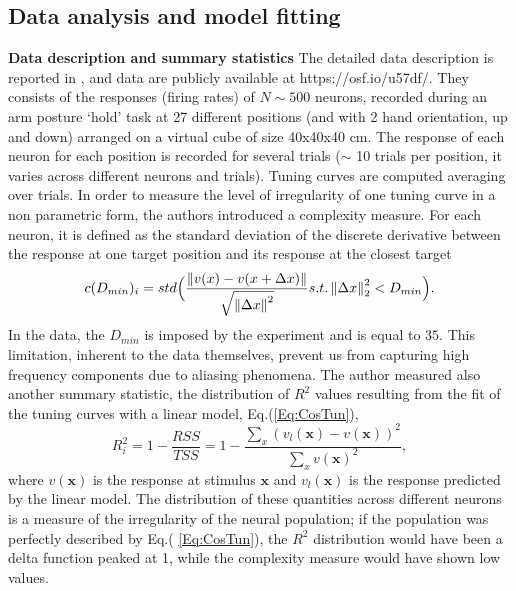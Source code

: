 \documentclass[a4paper]{article}%
\begin{document}
\subsection{Data analysis and model fitting}
\textbf{Data description and summary statistics}
The detailed data description is reported in
\cite{Lalazar2016TuningConnectivity}, and data are publicly available at https://osf.io/u57df/. They consists of  the
responses (firing rates) of $N \sim 500$ neurons,  recorded during an arm posture `hold' task at 27
different positions (and with 2 hand orientation, up and down) arranged on a
virtual cube of size 40x40x40 cm. The response of each neuron for each
position is recorded for several trials ($\sim$ 10 trials per position, it varies across different neurons and trials).  Tuning curves are computed averaging over trials. In order to measure the
level of irregularity of one tuning curve in a non parametric form, the
authors introduced a
complexity measure. For each neuron, it is defined as the standard deviation
of the discrete derivative between the response at one target position and its response
at the closest target
\begin{equation}
c(D_{min})_{i} = std\Bigl(\frac{\left\|  v(x) - v(x+\Delta x)\right\|  }
{\sqrt{\left\|  \Delta x\right\|  ^{2}}} s.t. \left\|  \Delta x\right\|
_{2}^{2} < D_{min}\Bigr).
\end{equation}
In the data, the $D_{min}$ is imposed by the experiment and is equal to $35$.
This limitation, inherent to the data themselves, prevent us from capturing
high frequency components due to aliasing phenomena. The author measured also another summary statistic, the distribution of $R^{2}$
values resulting from the fit of the tuning curves with a linear model, Eq.(\ref{Eq:CosTun}),
\begin{equation}
R^{2}_{i} = 1- \frac{RSS}{TSS} = 1-\frac{\sum_{x}\left(v_{l}(\mathbf{x}) -
v(\mathbf{x})\right)^{2}}{\sum_{x} v(\mathbf{x})^{2}},
\end{equation}
where $v(\mathbf{x})$ is the response at stimulus $\mathbf{x}$ and
$v_{l}(\mathbf{x})$ is the response predicted by the linear model. The distribution of these quantities across different neurons is a measure of the irregularity of the neural population; if the population was perfectly described by Eq.( \ref{Eq:CosTun}), the $R^2$ distribution would have been a delta function peaked at 1, while the complexity measure would have shown low values. 
\end{document}
